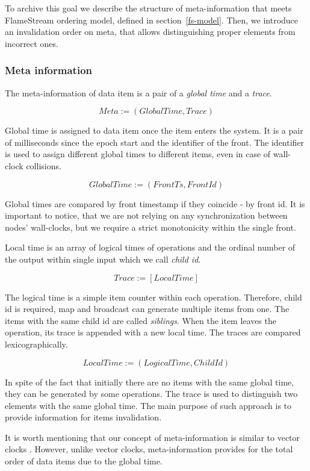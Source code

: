 To archive this goal we describe the structure of meta-information that meets FlameStream ordering model, defined in section~\ref{fs-model}. Then, we introduce an invalidation order on meta, that allows distinguishing proper elements from incorrect ones.

\subsubsection{Meta information}
The meta-information of data item is a pair of a {\it global time} and a {\it trace}.

\[Meta := (GlobalTime, Trace)\]

Global time is assigned to data item once the item enters the system. It is a pair of milliseconds since the epoch start and the identifier of the front. The identifier is used to assign different global times to different items, even in case of wall-clock collisions. 

\[GlobalTime := (FrontTs, FrontId)\]

Global times are compared by front timestamp if they coincide - by front id. It is important to notice, that we are not relying on any synchronization between nodes' wall-clocks, but we require a strict monotonicity within the single front.

Local time is an array of logical times of operations and the ordinal number of the output within single input which we call {\it child id}. 

\[Trace := [LocalTime]\]

The logical time is a simple item counter within each operation. Therefore, child id is required, map and broadcast can generate multiple items from one. The items with the same child id are called {\it siblings}. When the item leaves the operation, its trace is appended with a new local time. The traces are compared lexicographically.

\[LocalTime := (LogicalTime, ChildId)\]

In spite of the fact that initially there are no items with the same global time, they can be generated by some operations. The trace is used to distinguish two elements with the same global time. The main purpose of such approach is to provide information for items invalidation. 

It is worth mentioning that our concept of meta-information is similar to vector clocks
\cite{fidge1988timestamps, mattern88virtualtime}. However, unlike vector clocks, meta-information provides for the total order of data items due to the global time.

